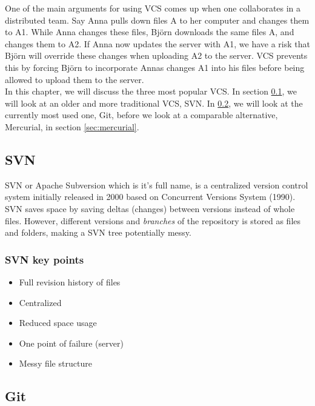 \documentclass{report}
\begin{document}
One of the main arguments for using VCS comes up when one collaborates in a distributed team. Say Anna pulls down files A to her computer and changes them to A1. While Anna changes these files, Björn downloads the same files A, and changes them to A2. If Anna now updates the server with A1, we have a risk that Björn will override these changes when uploading A2 to the server. VCS prevents this by forcing Björn to incorporate Annas changes A1 into his files before being allowed to upload them to the server. \\

In this chapter, we will discuss the three most popular VCS. In section \ref{sec:svn}, we will look at an older and more traditional VCS, SVN. In \ref{sec:git}, we will look at the currently most used one, Git, before we look at a comparable alternative, Mercurial, in section \ref{sec:mercurial}.

\subsection{SVN}  \label{sec:svn}
SVN or Apache Subversion\cite{website:svn} which is it's full name, is a centralized version control system initially released in 2000\cite{website:svn_wiki} based on Concurrent Versions System (1990)\cite{website:cvn_wiki}. SVN saves space by saving deltas (changes) between versions instead of whole files. However, different versions and \emph{branches} of the repository is stored as files and folders, making a SVN tree potentially messy.

\subsubsection{SVN key points}

\begin{itemize}
\item Full revision history of files
\item Centralized
\item Reduced space usage
\item One point of failure (server)
\item Messy file structure
\end{itemize}

\subsection{Git} \label{sec:git}
\end{document}
